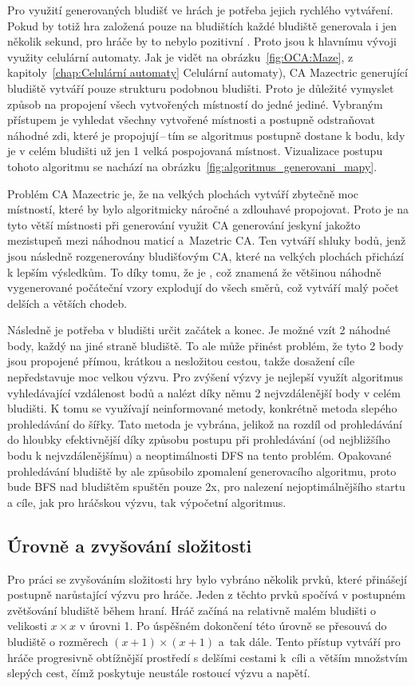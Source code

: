 Pro využití generovaných bludišť ve hrách je potřeba jejich rychlého vytváření. Pokud by totiž hra založená pouze na bludištích každé bludiště generovala i jen několik sekund, pro hráče by to nebylo pozitivní . Proto jsou k hlavnímu vývoji využity celulární automaty. Jak je vidět na obrázku~\ref{fig:OCA:Maze}, z kapitoly~\ref{chap:Celulární automaty} Celulární automaty), CA Mazectric generující bludiště vytváří pouze strukturu podobnou bludišti. Proto je důležité vymyslet způsob na propojení všech vytvořených místností do jedné jediné. Vybraným přístupem je vyhledat všechny vytvořené místnosti a postupně odstraňovat náhodné zdi, které je propojují\,--\,tím se algoritmus postupně dostane k bodu, kdy je v celém bludišti už jen 1 velká pospojovaná místnost. Vizualizace postupu tohoto algoritmu se nachází na obrázku~\ref{fig:algoritmus_generovani_mapy}.

Problém CA Mazectric je, že na velkých plochách vytváří zbytečně moc místností, které by bylo algoritmicky náročné a zdlouhavé propojovat. Proto je na tyto větší místnosti při generování využit CA generování jeskyní jakožto mezistupeň mezi náhodnou maticí a~Mazetric CA. Ten vytváří shluky bodů, jenž jsou následně rozgenerovány bludišťovým CA, které na velkých plochách přichází k lepším výsledkům. To díky tomu, že je , což znamená že většinou náhodně
vygenerované počáteční vzory explodují do všech směrů, což vytváří malý počet delších a větších chodeb.

Následně je potřeba v bludišti určit začátek a konec. Je možné vzít 2 náhodné body, každý na jiné straně bludiště. To ale může přinést problém, že tyto 2 body jsou propojené přímou, krátkou a nesložitou cestou, takže dosažení cíle nepředstavuje moc velkou výzvu. Pro zvýšení výzvy je nejlepší využít algoritmus vyhledávající vzdálenost bodů a nalézt díky němu 2 nejvzdálenější body v celém bludišti. K tomu se využívají neinformované metody, konkrétně metoda slepého prohledávání do šířky. Tato metoda je vybrána, jelikož na rozdíl od prohledávání do hloubky efektivnější díky způsobu postupu při prohledávání (od nejbližšího bodu k nejvzdálenějšímu) a neoptimálnosti DFS na tento problém. Opakované prohledávání bludiště by ale způsobilo zpomalení generovacího algoritmu, proto bude BFS nad bludištěm spuštěn pouze 2x, pro nalezení nejoptimálnějšího startu a cíle, jak pro hráčskou výzvu, tak výpočetní algoritmus.

\subsection*{Úrovně a zvyšování složitosti}
Pro práci se zvyšováním složitosti hry bylo vybráno několik prvků, které přinášejí postupně narůstající výzvu pro hráče. Jeden z těchto prvků spočívá v postupném zvětšování bludiště během hraní. Hráč začíná na relativně malém bludišti o velikosti $x \times x$ v úrovni 1. Po úspěšném dokončení této úrovně se přesouvá do bludiště o rozměrech $(x + 1) \times (x + 1)$ a~tak dále. Tento přístup vytváří pro hráče progresivně obtížnější prostředí s delšími cestami k~cíli a větším množstvím slepých cest, čímž poskytuje neustále rostoucí výzvu a napětí.

